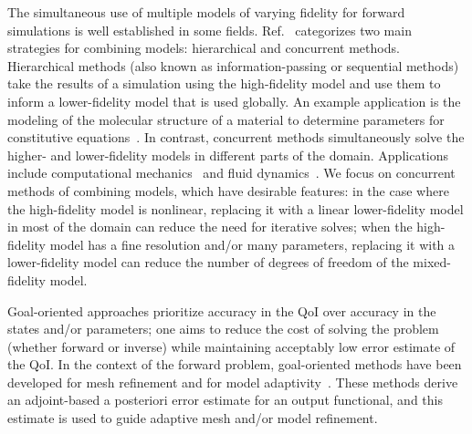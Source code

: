 The simultaneous use of multiple models of varying fidelity for forward simulations is well established in some fields. Ref.~\cite{Liuetal03} categorizes two main strategies for combining models: hierarchical and concurrent methods. Hierarchical methods (also known as information-passing or sequential methods) take the results of a simulation using the high-fidelity model and use them to inform a lower-fidelity model that is used globally. An example application is the modeling of the molecular structure of a material to determine parameters for constitutive equations~\cite{Haoetal03,Weietal04}. In contrast, concurrent methods simultaneously solve the higher- and lower-fidelity models in different parts of the domain. Applications include computational mechanics~\cite{Khareetal08,Prudetal08} and fluid dynamics~\cite{vanOpstaletal15,LucKinBer02,FatGerQua01}.
We focus on concurrent methods of combining models, which have desirable features: in the case where the high-fidelity model is nonlinear, replacing it with a linear lower-fidelity model in most of the domain can reduce the need for iterative solves;
when the high-fidelity model has a fine resolution and/or many parameters, replacing it with a lower-fidelity model can reduce the number of degrees of freedom of the mixed-fidelity model.

Goal-oriented approaches prioritize accuracy in the QoI over accuracy in the states and/or parameters; one aims to reduce the cost of solving the problem (whether forward or inverse) while maintaining acceptably low error estimate of the QoI. In the context of the forward problem, goal-oriented methods have been developed for mesh refinement \cite{PrudOden99,VendDarm00,BecRann01,Yano12} and for model adaptivity~\cite{OdenPrudetal06,BraackErn03}. 
These methods derive an adjoint-based a posteriori error estimate for an output functional, and this estimate is used to guide adaptive mesh and/or model refinement.

